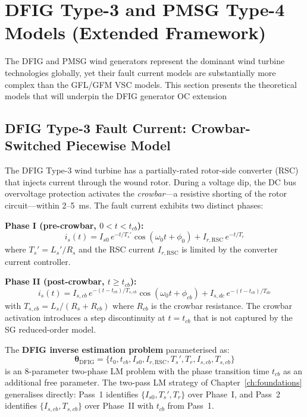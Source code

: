 \section{DFIG Type-3 and PMSG Type-4 Models (Extended Framework)}
\label{sec:ch3_dfig}

The DFIG and PMSG wind generators represent the dominant wind turbine
technologies globally, yet their fault current models are substantially
more complex than the GFL/GFM VSC models. This section presents the
theoretical models that will underpin the DFIG generator OC extension

\subsection{DFIG Type-3 Fault Current: Crowbar-Switched Piecewise Model}

The DFIG Type-3 wind turbine has a partially-rated rotor-side converter
(RSC) that injects current through the wound rotor. During a voltage dip,
the DC bus overvoltage protection activates the \emph{crowbar}---a
resistive shorting of the rotor circuit---within 2--5~ms. The fault
current exhibits two distinct phases:

\textbf{Phase I (pre-crowbar, $0 < t < t_{cb}$):}
\begin{equation}
  i_s(t) = I_{s0}\,e^{-t/T_s'}\cos(\omega_0 t + \phi_0)
          + I_{r,\mathrm{RSC}}\,e^{-t/T_r}
  \label{eq:ch3_dfig_phase1}
\end{equation}
where $T_s' = L_s'/R_s$ and the RSC current $I_{r,\mathrm{RSC}}$ is
limited by the converter current controller.

\textbf{Phase II (post-crowbar, $t \geq t_{cb}$):}
\begin{equation}
  i_s(t) = I_{s,cb}\,e^{-(t-t_{cb})/T_{s,cb}}\cos(\omega_0 t + \phi_{cb})
          + I_{s,dc}\,e^{-(t-t_{cb})/T_{dc}}
  \label{eq:ch3_dfig_phase2}
\end{equation}
with $T_{s,cb} = L_s / (R_s + R_{cb})$ where $R_{cb}$ is the crowbar
resistance. The crowbar activation introduces a step discontinuity at
$t = t_{cb}$ that is not captured by the SG reduced-order model.

The \textbf{DFIG inverse estimation problem} parameterised as:
\begin{equation}
  \bm{\theta}_\mathrm{DFIG} = \{t_0, t_{cb}, I_{s0}, I_{r,\mathrm{RSC}},
    T_s', T_r, I_{s,cb}, T_{s,cb}\}
  \label{eq:ch3_dfig_params}
\end{equation}
is an 8-parameter two-phase LM problem with the phase transition time
$t_{cb}$ as an additional free parameter. The two-pass LM strategy of
Chapter~\ref{ch:foundations} generalises directly: Pass~1 identifies
$\{I_{s0}, T_s', T_r\}$ over Phase~I, and Pass~2 identifies
$\{I_{s,cb}, T_{s,cb}\}$ over Phase~II with $t_{cb}$ from Pass~1.


